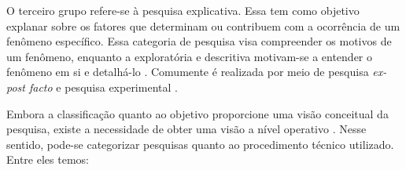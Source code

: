  \par
  \indent O terceiro grupo refere-se à pesquisa explicativa. Essa tem como objetivo explanar sobre os fatores que determinam ou contribuem com  a ocorrência de um fenômeno específico. Essa categoria de pesquisa visa compreender os motivos de um fenômeno, enquanto a exploratória e descritiva motivam-se a entender o fenômeno em si e detalhá-lo \cite{gil2002}. Comumente é realizada por meio de pesquisa  \textit{ex-post facto} e pesquisa experimental \cite{tafner2007}.

 \par
 \indent Embora a classificação quanto ao objetivo proporcione uma visão conceitual da pesquisa, existe a necessidade de obter uma visão a nível operativo \cite{gil2002}. Nesse sentido, pode-se categorizar pesquisas quanto ao procedimento técnico utilizado. Entre eles temos:
 
